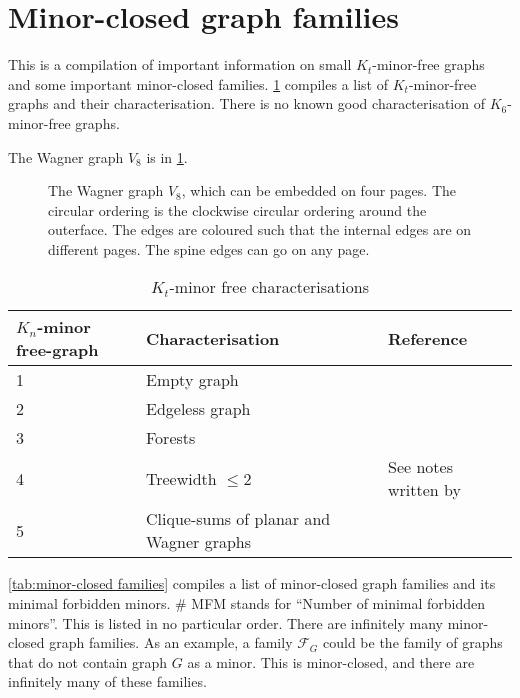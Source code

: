 \section{Minor-closed graph families}\label{sec:minor_closed_families}
This is a compilation of important information on small $K_t$-minor-free graphs and some important minor-closed families. \cref{tab:kt_minor_free} compiles a list of $K_t$-minor-free graphs and their characterisation. There is no known good characterisation of $K_6$-minor-free graphs. 

The Wagner graph $V_8$ is in \cref{fig:wagner}. 
\begin{figure}[h!]
	\centering
	\begin{tikzpicture}[thick,scale=1.5, every node/.style={scale=2}]
		
	\end{tikzpicture}
	\caption[Wagner graph]{The Wagner graph $V_8$, which can be embedded on four pages. The circular ordering is the clockwise circular ordering around the outerface. The edges are coloured such that the internal edges are on different pages. The spine edges can go on any page.}\label{fig:wagner}
\end{figure}

\begin{table}[h!]
    \centering
    \caption{$K_t$-minor free characterisations}\label{tab:kt_minor_free}
    \begin{tabular*}{\textwidth}{@{}lll@{}}
        \toprule
        $K_n$-minor free-graph  & Characterisation  & Reference \\
        \midrule
        1                       & Empty graph       &           \\
        2                       & Edgeless graph    &           \\
        3                       & Forests           &           \\
        4                       & Treewidth $\leq 2$&  See notes written by {\textcite{norinMath599GraphMinors2017}}         \\
        5                       & Clique-sums of planar and Wagner graphs & {\textcite{wagnerUeberEigenschaftEbenen1937}}\\
        \bottomrule
    \end{tabular*}
\end{table}

\cref{tab:minor-closed families} compiles a list of minor-closed graph families and its minimal forbidden minors. \# MFM stands for ``Number of minimal forbidden minors''.
This is listed in no particular order. There are infinitely many minor-closed graph families. As an example, a family $\mathcal{F}_G$ could be the family of graphs that do not contain graph $G$ as a minor. This is minor-closed, and there are infinitely many of these families.

